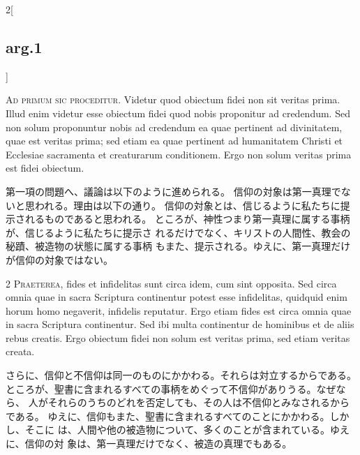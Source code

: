 \documentclass[paper=a4paper,fontsize=10pt,jafontsize=9pt,titlepage]{jlreq}
\begin{document}
\begin{paracol}{2}[\subsection{arg.1}]

{\huge A}{\scshape d primum sic proceditur}. Videtur quod
obiectum fidei non sit veritas prima. Illud enim videtur esse obiectum
fidei quod nobis proponitur ad credendum. Sed non solum proponuntur
nobis ad credendum ea quae pertinent ad divinitatem, quae est veritas
prima; sed etiam ea quae pertinent ad humanitatem Christi et Ecclesiae
sacramenta et creaturarum conditionem. Ergo non solum veritas prima est
fidei obiectum.

\switchcolumn

第一項の問題へ、議論は以下のように進められる。
信仰の対象は第一真理でないと思われる。理由は以下の通り。
信仰の対象とは、信じるように私たちに提示されるものであると思われる。
ところが、神性つまり第一真理に属する事柄が、信じるように私たちに提示さ
 れるだけでなく、キリストの人間性、教会の秘蹟、被造物の状態に属する事柄
 もまた、提示される。ゆえに、第一真理だけが信仰の対象ではない。


{\scshape 2 Praeterea}, fides et infidelitas sunt
circa idem, cum sint opposita. Sed circa omnia quae in sacra Scriptura
continentur potest esse infidelitas, quidquid enim horum homo negaverit,
infidelis reputatur. Ergo etiam fides est circa omnia quae in sacra
Scriptura continentur. Sed ibi multa continentur de hominibus et de
aliis rebus creatis. Ergo obiectum fidei non solum est veritas prima,
sed etiam veritas creata.

\switchcolumn

さらに、信仰と不信仰は同一のものにかかわる。それらは対立するからである。
ところが、聖書に含まれるすべての事柄をめぐって不信仰がありうる。なぜなら、
人がそれらのうちのどれを否定しても、その人は不信仰とみなされるからである。
ゆえに、信仰もまた、聖書に含まれるすべてのことにかかわる。しかし、そこに
は、人間や他の被造物について、多くのことが含まれている。ゆえに、信仰の対
象は、第一真理だけでなく、被造の真理でもある。



\end{paracol}
\end{document}

